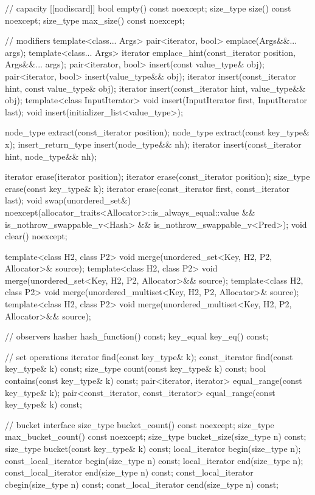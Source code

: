 \begin{codeblock}
{{    // capacity
    [[nodiscard]] bool empty() const noexcept;
    size_type size() const noexcept;
    size_type max_size() const noexcept;

    // modifiers
    template<class... Args> pair<iterator, bool> emplace(Args&&... args);
    template<class... Args> iterator emplace_hint(const_iterator position, Args&&... args);
    pair<iterator, bool> insert(const value_type& obj);
    pair<iterator, bool> insert(value_type&& obj);
    iterator insert(const_iterator hint, const value_type& obj);
    iterator insert(const_iterator hint, value_type&& obj);
    template<class InputIterator> void insert(InputIterator first, InputIterator last);
    void insert(initializer_list<value_type>);

    node_type extract(const_iterator position);
    node_type extract(const key_type& x);
    insert_return_type insert(node_type&& nh);
    iterator           insert(const_iterator hint, node_type&& nh);

    iterator  erase(iterator position);
    iterator  erase(const_iterator position);
    size_type erase(const key_type& k);
    iterator  erase(const_iterator first, const_iterator last);
    void      swap(unordered_set&)
      noexcept(allocator_traits<Allocator>::is_always_equal::value &&
               is_nothrow_swappable_v<Hash> &&
               is_nothrow_swappable_v<Pred>);
    void      clear() noexcept;

    template<class H2, class P2>
      void merge(unordered_set<Key, H2, P2, Allocator>& source);
    template<class H2, class P2>
      void merge(unordered_set<Key, H2, P2, Allocator>&& source);
    template<class H2, class P2>
      void merge(unordered_multiset<Key, H2, P2, Allocator>& source);
    template<class H2, class P2>
      void merge(unordered_multiset<Key, H2, P2, Allocator>&& source);

    // observers
    hasher hash_function() const;
    key_equal key_eq() const;

    // set operations
    iterator       find(const key_type& k);
    const_iterator find(const key_type& k) const;
    size_type      count(const key_type& k) const;
    bool           contains(const key_type& k) const;
    pair<iterator, iterator>             equal_range(const key_type& k);
    pair<const_iterator, const_iterator> equal_range(const key_type& k) const;

    // bucket interface
    size_type bucket_count() const noexcept;
    size_type max_bucket_count() const noexcept;
    size_type bucket_size(size_type n) const;
    size_type bucket(const key_type& k) const;
    local_iterator begin(size_type n);
    const_local_iterator begin(size_type n) const;
    local_iterator end(size_type n);
    const_local_iterator end(size_type n) const;
    const_local_iterator cbegin(size_type n) const;
    const_local_iterator cend(size_type n) const;

}}
\end{codeblock}
